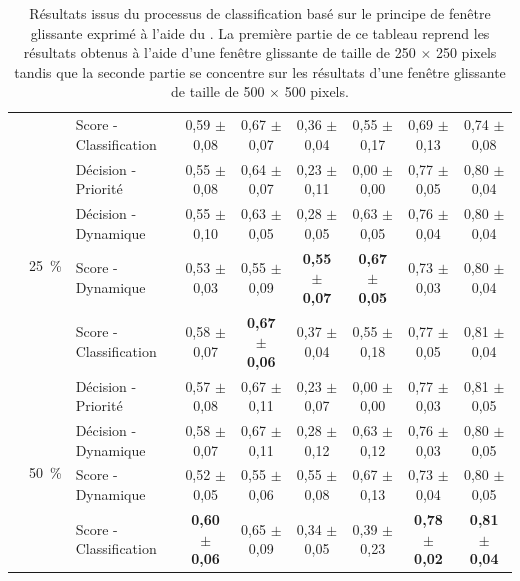 {\begin{landscape}
\begin{table}[p]
\begin{tabular}{lllcccccc}
							        &                               & Score - Classification    & 0,59 $\pm$ 0,08         & 0,67 $\pm$ 0,07         & 0,36 $\pm$ 0,04         & 0,55 $\pm$ 0,17         & 0,69 $\pm$ 0,13         & 0,74 $\pm$ 0,08         \\ \cline{2-9}
							        & \multirow{4}{*}{25~\%}         & Décision - Priorité       & 0,55 $\pm$ 0,08         & 0,64 $\pm$ 0,07         & 0,23 $\pm$ 0,11         & 0,00 $\pm$ 0,00         & 0,77 $\pm$ 0,05         & 0,80 $\pm$ 0,04         \\
							        &                               & Décision - Dynamique      & 0,55 $\pm$ 0,10         & 0,63 $\pm$ 0,05         & 0,28 $\pm$ 0,05         & 0,63 $\pm$ 0,05         & 0,76 $\pm$ 0,04         & 0,80 $\pm$ 0,04         \\
							        &                               & Score - Dynamique         & 0,53 $\pm$ 0,03         & 0,55 $\pm$ 0,09         & \textbf{0,55 $\pm$ 0,07}& \textbf{0,67 $\pm$ 0,05}& 0,73 $\pm$ 0,03         & 0,80 $\pm$ 0,04         \\
							        &                               & Score - Classification    & 0,58 $\pm$ 0,07         & \textbf{0,67 $\pm$ 0,06}& 0,37 $\pm$ 0,04         & 0,55 $\pm$ 0,18         & 0,77 $\pm$ 0,05         & 0,81 $\pm$ 0,04         \\ \cline{2-9}
							        & \multirow{4}{*}{50~\%}         & Décision - Priorité       & 0,57 $\pm$ 0,08         & 0,67 $\pm$ 0,11         & 0,23 $\pm$ 0,07         & 0,00 $\pm$ 0,00         & 0,77 $\pm$ 0,03         & 0,81 $\pm$ 0,05         \\
							        &                               & Décision - Dynamique      & 0,58 $\pm$ 0,07         & 0,67 $\pm$ 0,11         & 0,28 $\pm$ 0,12         & 0,63 $\pm$ 0,12         & 0,76 $\pm$ 0,03         & 0,80 $\pm$ 0,05         \\
							        &                               & Score - Dynamique         & 0,52 $\pm$ 0,05         & 0,55 $\pm$ 0,06         & 0,55 $\pm$ 0,08         & 0,67 $\pm$ 0,13         & 0,73 $\pm$ 0,04         & 0,80 $\pm$ 0,05         \\ \rowcolor[HTML]{E7E6E6}
		                            &                               & Score - Classification    & \textbf{0,60 $\pm$ 0,06}& 0,65 $\pm$ 0,09         & 0,34 $\pm$ 0,05         & 0,39 $\pm$ 0,23         & \textbf{0,78 $\pm$ 0,02}& \textbf{0,81 $\pm$ 0,04}\\
		\bottomrule
    \end{tabular}
    \caption{Résultats issus du processus de classification basé sur le principe de fenêtre glissante exprimé à l'aide du \fscore. La première partie de ce tableau reprend les résultats obtenus à l'aide d'une fenêtre glissante de taille de 250 $\times$ 250 pixels tandis que la seconde partie se concentre sur les résultats d'une fenêtre glissante de taille de 500 $\times$ 500 pixels.}
    \label{tab:results_image_improvement_sliding_window}
\end{table}
\end{landscape}}


